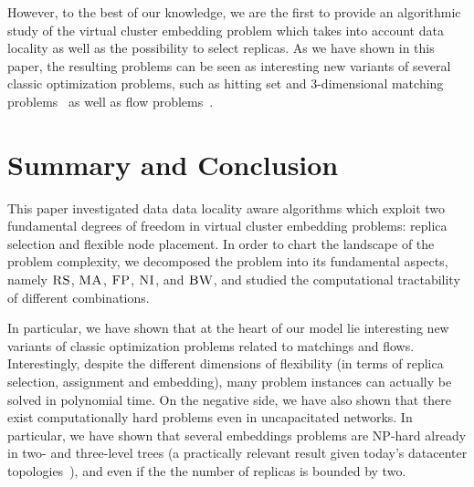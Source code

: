 \documentclass[9pt]{sigcomm-alternate}
\newcommand{\CC}{\textsc{NI}}
\newcommand{\FP}{\textsc{FP}}
\newcommand{\RS}{\textsc{RS}}
\newcommand{\BW}{\textsc{BW}}
\newcommand{\MA}{\textsc{MA}}
\begin{document}
However, to the best of our knowledge, we are the first to provide an algorithmic
study of the virtual cluster embedding problem which takes into account
data locality as well as the possibility to select replicas. As we have shown in this paper,
the resulting problems can be seen as interesting new variants of several classic optimization
problems, such as hitting set and 3-dimensional matching problems~\cite{3SC-hard} as well as flow problems~\cite{korte2002combinatorial}.

\section{Summary and Conclusion}\label{sec:conclusion}

This paper investigated data data locality aware algorithms which exploit two fundamental
degrees of freedom in virtual cluster
embedding problems: replica selection and flexible node placement. In order to
chart the landscape of the problem complexity, we
decomposed the problem into its fundamental aspects,
namely $\RS$, $\MA$, $\FP$, $\CC$, and $\BW$, and studied the computational
tractability of different combinations.

In particular, we have shown that
at the heart of our model lie interesting new variants of classic
optimization problems related to matchings and flows. Interestingly, despite the
different dimensions of flexibility (in terms of replica selection, assignment and embedding),
many problem instances can actually be solved in polynomial time.
On the negative side, we have also shown that there exist computationally hard
problems even in uncapacitated networks. In particular,
we have shown that several embeddings problems are NP-hard already in two- and three-level trees
(a practically relevant result given today's datacenter topologies~\cite{fattree}),
and even if the the number of replicas is bounded by two.
\end{document}
